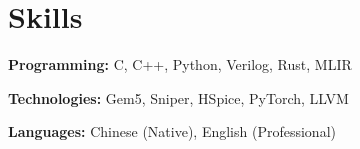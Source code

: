 \documentclass[letterpaper,11pt]{article}
\newcommand{\resumeSubHeadingListStart}{\begin{itemize}[leftmargin=0.15in, label={}]}
\newcommand{\resumeSubHeadingListEnd}{\end{itemize}}
\begin{document}
\section{Skills}
  \vspace{2pt}
  \resumeSubHeadingListStart
    \small{\item{
        \textbf{Programming: }{C, C++, Python, Verilog, Rust, MLIR} \\ \vspace{3pt}
        
        \textbf{Technologies: }{Gem5, Sniper, HSpice, PyTorch, LLVM} \\ \vspace{3pt}
        
        \textbf{Languages:}{ Chinese (Native), English (Professional)}
        
    }}
  \resumeSubHeadingListEnd




        




    
\end{document}
